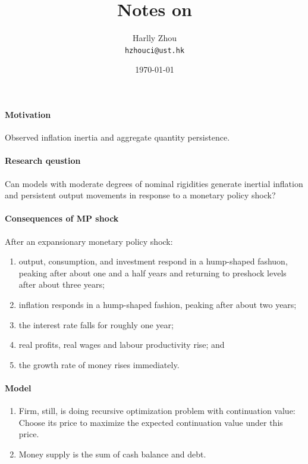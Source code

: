 \documentclass[12pt]{article}
\title{Notes on \cite{christianoNominalRigiditiesDynamic2005}}
\author{Harlly Zhou \\ \texttt{hzhouci@ust.hk}}
\date{\today}
\numberwithin{equation}{section}
\begin{document}
\maketitle

\paragraph{Motivation} Observed inflation inertia and aggregate quantity persistence.

\paragraph{Research qeustion} Can models with moderate degrees of nominal rigidities generate inertial inflation and persistent output movements in response to a monetary policy shock?

\paragraph{Consequences of MP shock} After an expansionary monetary policy shock:
\begin{enumerate}
    \item output, consumption, and investment respond in a hump-shaped fashuon, peaking after about one and a half years and returning to preshock levels after about three years;
    \item inflation responds in a hump-shaped fashion, peaking after about two years;
    \item the interest rate falls for roughly one year;
    \item real profits, real wages and labour productivity rise; and
    \item the growth rate of money rises immediately.
\end{enumerate}

\paragraph{Model} 
\begin{enumerate}
    \item Firm, still, is doing recursive optimization problem with continuation value: Choose its price to maximize the expected continuation value under this price.
    \item Money supply is the sum of cash balance and debt.
\end{enumerate}





\end{document}
